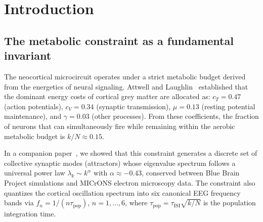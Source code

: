 \documentclass[aps,pre,twocolumn,showpacs,superscriptaddress,longbibliography]{revtex4-2}
\newcommand{\kN}{k/N}
\newcommand{\taupop}{\tau_{\mathrm{pop}}}
\newcommand{\tauISI}{\tau_{\mathrm{ISI}}}
\newcommand{\hneu}{h_{\mathrm{neural}}}
\begin{document}
\begin{abstract}
larger spatial scales, culminating in whole-cortex collapse and
ictal silence. The semantic inertia $\hneu$, which quantifies
the action required to process one nat of activation information,
scales from $5.47 \times 10^{-14}\,\mathrm{J\cdot s}$ at the
microcircuit to $1.51 \times 10^{-9}\,\mathrm{J\cdot s}$ at
the whole-cortex scale---a $27{,}600\times$ amplification that
formalizes the resistance of large-scale cortical representations
to perturbation. These results establish the metabolic constraint
$\kN = 0.15$ as a multi-scale invariant of cortical dynamics,
with the spectral power law $\lambda_k \sim k^{-0.43}$ as its
eigenvalue signature at every hierarchical level.
\end{abstract}


\maketitle

\section{\label{sec:intro}Introduction}

\subsection{The metabolic constraint as a fundamental invariant}

The neocortical microcircuit operates under a strict metabolic
budget derived from the energetics of neural signaling.
Attwell and Laughlin~\cite{Attwell2001} established that the
dominant energy costs of cortical grey matter are allocated as:
$c_T = 0.47$ (action potentials), $c_V = 0.34$ (synaptic
transmission), $\mu = 0.13$ (resting potential maintenance),
and $\gamma = 0.03$ (other processes). From these coefficients,
the fraction of neurons that can simultaneously fire while
remaining within the aerobic metabolic budget is
$\kN \approx 0.15$.

In a companion paper~\cite{Santos2025a}, we showed that this
constraint generates a discrete set of collective synaptic
modes (attractors) whose eigenvalue spectrum follows a universal
power law $\lambda_k \sim k^\alpha$ with $\alpha \approx -0.43$,
conserved between Blue Brain Project simulations and MICrONS
electron microscopy data. The constraint also quantizes the
cortical oscillation spectrum into six canonical EEG frequency
bands via $f_n = 1/(n\taupop)$, $n = 1, \ldots, 6$, where
$\taupop = \tauISI\sqrt{\kN}$ is the population integration time.
\end{document}
